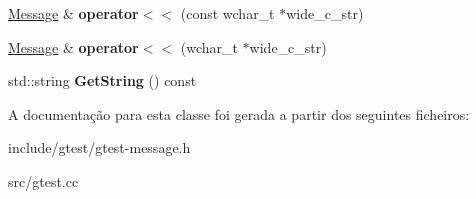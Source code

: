 \begin{DoxyCompactItemize}
\item 
\hypertarget{classtesting_1_1Message_ac0db9c22535b28bc863bfd0a1fdf7e14}{\hyperlink{classtesting_1_1Message}{Message} \& {\bfseries operator$<$$<$} (const wchar\-\_\-t $\ast$wide\-\_\-c\-\_\-str)}\label{classtesting_1_1Message_ac0db9c22535b28bc863bfd0a1fdf7e14}

\item 
\hypertarget{classtesting_1_1Message_ac1d3a041ac4bb9c929ee746b31a13d6a}{\hyperlink{classtesting_1_1Message}{Message} \& {\bfseries operator$<$$<$} (wchar\-\_\-t $\ast$wide\-\_\-c\-\_\-str)}\label{classtesting_1_1Message_ac1d3a041ac4bb9c929ee746b31a13d6a}

\item 
\hypertarget{classtesting_1_1Message_abe8c1b7584aa670dd0e2413e8317a937}{std\-::string {\bfseries Get\-String} () const }\label{classtesting_1_1Message_abe8c1b7584aa670dd0e2413e8317a937}

\end{DoxyCompactItemize}


A documentação para esta classe foi gerada a partir dos seguintes ficheiros\-:\begin{DoxyCompactItemize}
\item 
include/gtest/gtest-\/message.\-h\item 
src/gtest.\-cc\end{DoxyCompactItemize}
